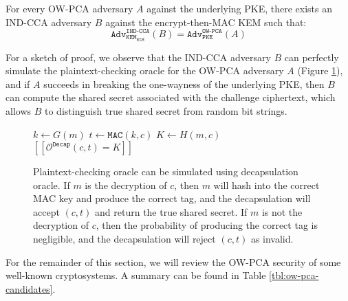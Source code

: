 \documentclass[runningheads]{llncs}
\newcommand{\pke}{\texttt{PKE}}
\newcommand{\kem}{\texttt{KEM}}
\newcommand{\decap}{\texttt{Decap}}
\newcommand{\etm}{\texttt{EtM}}  %
\newcommand{\mac}{\texttt{MAC}}
\newcommand{\pco}{\texttt{PCO}}
\newcommand{\llbrack}{[\![}
\newcommand{\rrbrack}{]\!]}
\newcommand{\adv}{\texttt{Adv}}
\begin{document}
\begin{lemma}\label{lemma:ind-cca-implies-ow-pca}
    For every OW-PCA adversary $A$ against the underlying PKE, there exists an IND-CCA adversary $B$ against the encrypt-then-MAC KEM such that:
    \begin{equation*}
        \adv^\texttt{IND-CCA}_{\kem_\etm}(B) = \adv^\texttt{OW-PCA}_{\pke}(A)
    \end{equation*}
\end{lemma}

For a sketch of proof, we observe that the IND-CCA adversary $B$ can perfectly simulate the plaintext-checking oracle for the OW-PCA adversary $A$ (Figure \ref{fig:simulate-pca-oracle-with-cca-oracle}), and if $A$ succeeds in breaking the one-wayness of the underlying PKE, then $B$ can compute the shared secret associated with the challenge ciphertext, which allows $B$ to distinguish true shared secret from random bit strings.

\begin{figure}[h]
    \centering
    \begin{minipage}[t]{0.4\textwidth}
        \begin{algorithm}[H]
            \caption*{$\mathcal{O}^\pco_\decap(m, c)$}
            \begin{algorithmic}[1]
                \State $k \leftarrow G(m)$
                \State $t \leftarrow \mac(k, c)$
                \State $K \leftarrow H(m, c)$
                \State \Return $\llbrack \mathcal{O}^\decap(c, t) = K\rrbrack$
            \end{algorithmic}
        \end{algorithm}
    \end{minipage}
    \caption{Plaintext-checking oracle can be simulated using decapsulation oracle. If $m$ is the decryption of $c$, then $m$ will hash into the correct MAC key and produce the correct tag, and the decapsulation will accept $(c, t)$ and return the true shared secret. If $m$ is not the decryption of $c$, then the probability of producing the correct tag is negligible, and the decapsulation will reject $(c, t)$ as invalid.}\label{fig:simulate-pca-oracle-with-cca-oracle}
\end{figure}

For the remainder of this section, we will review the OW-PCA security of some well-known cryptosystems. A summary can be found in Table \ref{tbl:ow-pca-candidates}.
\end{document}
